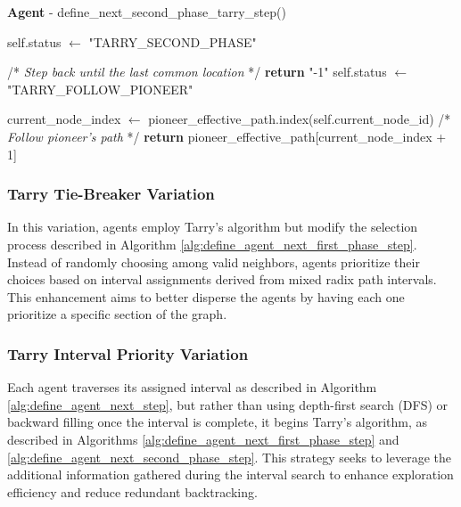\begin{algorithm}
\caption{\textbf{Agent} - define\_next\_second\_phase\_tarry\_step()}
\label{alg:define_agent_next_second_phase_step}
\begin{algorithmic}
            \State self.status $\gets$ "TARRY\_SECOND\_PHASE"
        \EndIf
        
                \State /* \textit{Step back until the last common location } */
                \State \textbf{return} "-1"
            \Else
                \State self.status $\gets$ "TARRY\_FOLLOW\_PIONEER"
            \EndIf
        \EndIf

        current\_node\_index $\gets$ pioneer\_effective\_path.index(self.current\_node\_id)
        \State /* \textit{Follow pioneer's path} */
        \State \textbf{return} pioneer\_effective\_path[current\_node\_index + 1]
    \EndProcedure
\end{algorithmic}
\end{algorithm}

\subsubsection{Tarry Tie-Breaker Variation}

In this variation, agents employ Tarry's algorithm but modify the selection process described in Algorithm \ref{alg:define_agent_next_first_phase_step}. Instead of randomly choosing among valid neighbors, agents prioritize their choices based on interval assignments derived from mixed radix path intervals. This enhancement aims to better disperse the agents by having each one prioritize a specific section of the graph.

\subsubsection{Tarry Interval Priority Variation}

Each agent traverses its assigned interval as described in Algorithm \ref{alg:define_agent_next_step}, but rather than using depth-first search (DFS) or backward filling once the interval is complete, it begins Tarry's algorithm, as described in Algorithms \ref{alg:define_agent_next_first_phase_step} and \ref{alg:define_agent_next_second_phase_step}. This strategy seeks to leverage the additional information gathered during the interval search to enhance exploration efficiency and reduce redundant backtracking.

